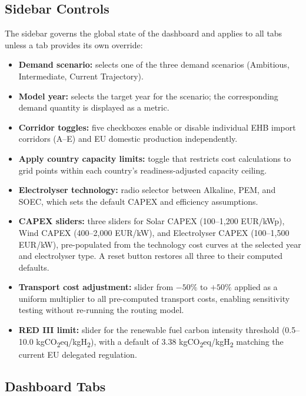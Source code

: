 \subsection{Sidebar Controls}

The sidebar governs the global state of the dashboard and applies to all tabs unless a tab provides its own override:

\begin{itemize}
    \item \textbf{Demand scenario:} selects one of the three demand scenarios (Ambitious, Intermediate, Current Trajectory).
    \item \textbf{Model year:} selects the target year for the scenario; the corresponding demand quantity is displayed as a metric.
    \item \textbf{Corridor toggles:} five checkboxes enable or disable individual EHB import corridors (A--E) and EU domestic production independently.
    \item \textbf{Apply country capacity limits:} toggle that restricts cost calculations to grid points within each country's readiness-adjusted capacity ceiling.
    \item \textbf{Electrolyser technology:} radio selector between Alkaline, PEM, and SOEC, which sets the default CAPEX and efficiency assumptions.
    \item \textbf{CAPEX sliders:} three sliders for Solar CAPEX (100--1{,}200 EUR/kWp), Wind CAPEX (400--2{,}000 EUR/kW), and Electrolyser CAPEX (100--1{,}500 EUR/kW), pre-populated from the technology cost curves at the selected year and electrolyser type. A reset button restores all three to their computed defaults.
    \item \textbf{Transport cost adjustment:} slider from $-50\%$ to $+50\%$ applied as a uniform multiplier to all pre-computed transport costs, enabling sensitivity testing without re-running the routing model.
    \item \textbf{RED III limit:} slider for the renewable fuel carbon intensity threshold (0.5--10.0 kgCO\textsubscript{2}eq/kgH\textsubscript{2}), with a default of 3.38 kgCO\textsubscript{2}eq/kgH\textsubscript{2} matching the current EU delegated regulation.
\end{itemize}

\subsection{Dashboard Tabs}


